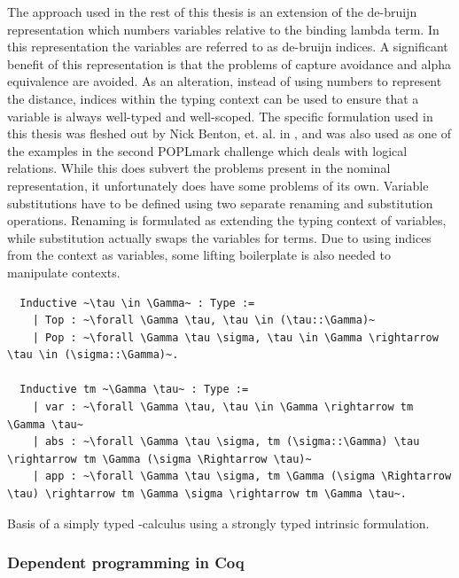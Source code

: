 \documentclass[12pt, final]{article}
\begin{document}
The approach used in the rest of this thesis is an extension of the de-bruijn representation which numbers variables relative to the binding lambda term.
In this representation the variables are referred to as de-bruijn indices.
A significant benefit of this representation is that the problems of capture avoidance and alpha equivalence are avoided.
As an alteration, instead of using numbers to represent the distance, indices within the typing context can be used to ensure that a variable is always well-typed and well-scoped.
The specific formulation used in this thesis was fleshed out by Nick Benton, et. al. in \cite{Benton2011}, and was also used as one of the examples in the second POPLmark challenge which deals with logical relations\cite{poplmark_reloaded}.
While this does subvert the problems present in the nominal representation, it unfortunately does have some problems of its own.
Variable substitutions have to be defined using two separate renaming and substitution operations.
Renaming is formulated as extending the typing context of variables, while substitution actually swaps the variables for terms.
Due to using indices from the context as variables, some lifting boilerplate is also needed to manipulate contexts.

\begin{listing}[h]
  \begin{verbatim}
  Inductive ~\tau \in \Gamma~ : Type :=
    | Top : ~\forall \Gamma \tau, \tau \in (\tau::\Gamma)~
    | Pop : ~\forall \Gamma \tau \sigma, \tau \in \Gamma \rightarrow \tau \in (\sigma::\Gamma)~.

  Inductive tm ~\Gamma \tau~ : Type :=
    | var : ~\forall \Gamma \tau, \tau \in \Gamma \rightarrow tm \Gamma \tau~
    | abs : ~\forall \Gamma \tau \sigma, tm (\sigma::\Gamma) \tau \rightarrow tm \Gamma (\sigma \Rightarrow \tau)~
    | app : ~\forall \Gamma \tau \sigma, tm \Gamma (\sigma \Rightarrow \tau) \rightarrow tm \Gamma \sigma \rightarrow tm \Gamma \tau~.
  \end{verbatim}
  \caption{Basis of a simply typed \lambda-calculus using a strongly typed intrinsic formulation.}
  \label{lst:strong_stlc}
\end{listing}

\subsubsection{Dependent programming in Coq}
\end{document}
